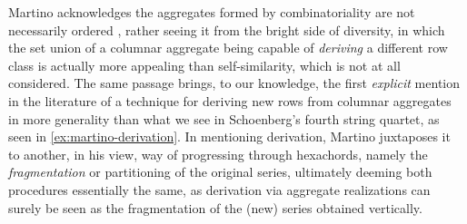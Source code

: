 Martino acknowledges the aggregates formed by combinatoriality are not necessarily ordered \cite[228]{Martino1961}, rather seeing it from the bright side of diversity, in which the set union of a columnar aggregate being capable of \emph{deriving} a different row class is actually more appealing than self-similarity, which is not at all considered. The same passage brings, to our knowledge, the first \emph{explicit} mention in the literature of a technique for deriving new rows from columnar aggregates in more generality than what we see in Schoenberg's fourth string quartet, as seen in \ref{ex:martino-derivation}. In mentioning derivation, Martino juxtaposes it to another, in his view, way of progressing through hexachords, namely the \emph{fragmentation} or partitioning of the original series, ultimately deeming both procedures essentially the same, as derivation via aggregate realizations can surely be seen as the fragmentation of the (new) series obtained vertically.

